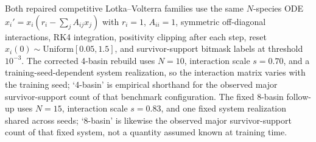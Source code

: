 Both repaired competitive Lotka--Volterra families use the same
$N$-species ODE
$x_i' = x_i (r_i - \sum_j A_{ij} x_j)$
with $r_i = 1$, $A_{ii} = 1$, symmetric off-diagonal interactions, RK4
integration, positivity clipping after each step, reset
$x_i(0) \sim \mathrm{Uniform}[0.05, 1.5]$, and survivor-support bitmask labels
at threshold $10^{-3}$. The corrected 4-basin rebuild uses $N=10$,
interaction scale $s=0.70$, and a training-seed-dependent system realization, so the interaction
matrix varies with the training seed; `4-basin' is empirical shorthand for the
observed major survivor-support count of that benchmark configuration. The
fixed 8-basin follow-up uses $N=15$, interaction scale $s=0.83$, and one fixed
system realization shared across seeds; `8-basin' is likewise the observed major
survivor-support count of that fixed system, not a quantity assumed known at
training time.


